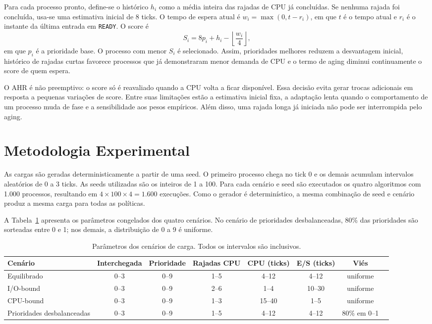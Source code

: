\documentclass[conference]{IEEEtran}
\begin{document}
Para cada processo pronto, define-se o histórico $h_i$ como a média inteira das rajadas de CPU já concluídas. Se nenhuma rajada foi concluída, usa-se uma estimativa inicial de 8 ticks. O tempo de espera atual é $w_i=\max(0,t-r_i)$, em que $t$ é o tempo atual e $r_i$ é o instante da última entrada em \texttt{READY}. O score é
\begin{equation}
S_i = 8p_i + h_i - \left\lfloor\frac{w_i}{4}\right\rfloor,
\label{eq:ahr}
\end{equation}
em que $p_i$ é a prioridade base. O processo com menor $S_i$ é selecionado. Assim, prioridades melhores reduzem a desvantagem inicial, histórico de rajadas curtas favorece processos que já demonstraram menor demanda de CPU e o termo de aging diminui continuamente o score de quem espera.

O AHR é não preemptivo: o score só é reavaliado quando a CPU volta a ficar disponível. Essa decisão evita gerar trocas adicionais em resposta a pequenas variações de score. Entre suas limitações estão a estimativa inicial fixa, a adaptação lenta quando o comportamento de um processo muda de fase e a sensibilidade aos pesos empíricos. Além disso, uma rajada longa já iniciada não pode ser interrompida pelo aging.

\section{Metodologia Experimental}
As cargas são geradas deterministicamente a partir de uma seed. O primeiro processo chega no tick 0 e os demais acumulam intervalos aleatórios de 0 a 3 ticks. As seeds utilizadas são os inteiros de 1 a 100. Para cada cenário e seed são executados os quatro algoritmos com 1.000 processos, resultando em $4\times100\times4=1.600$ execuções. Como o gerador é determinístico, a mesma combinação de seed e cenário produz a mesma carga para todas as políticas.

A Tabela~\ref{tab:cenarios} apresenta os parâmetros congelados dos quatro cenários. No cenário de prioridades desbalanceadas, 80\% das prioridades são sorteadas entre 0 e 1; nos demais, a distribuição de 0 a 9 é uniforme.

\begin{table}[t]
\caption{Parâmetros dos cenários de carga. Todos os intervalos são inclusivos.}
\label{tab:cenarios}
\centering
\scriptsize
\begin{tabular}{lccccccl}
\toprule
\textbf{Cenário} & \textbf{Interchegada} & \textbf{Prioridade} & \textbf{Rajadas CPU} & \textbf{CPU (ticks)} & \textbf{E/S (ticks)} & \textbf{Viés} \\
\midrule
Equilibrado & 0--3 & 0--9 & 1--5 & 4--12 & 4--12 & uniforme \\
I/O-bound & 0--3 & 0--9 & 2--6 & 1--4 & 10--30 & uniforme \\
CPU-bound & 0--3 & 0--9 & 1--3 & 15--40 & 1--5 & uniforme \\
Prioridades desbalanceadas & 0--3 & 0--9 & 1--5 & 4--12 & 4--12 & 80\% em 0--1 \\
\bottomrule
\end{tabular}
\end{table}
\end{document}
